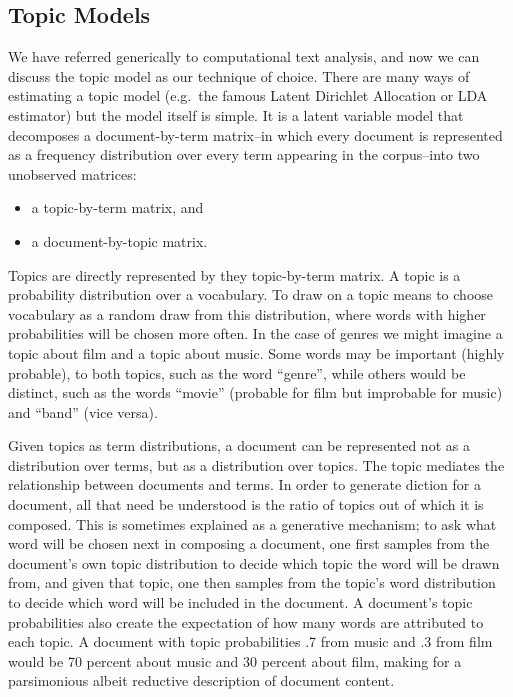 \documentclass[]{book}
\providecommand{\tightlist}{%
  \setlength{\itemsep}{0pt}\setlength{\parskip}{0pt}}
\theoremstyle{definition}
\theoremstyle{definition}
\theoremstyle{definition}
\theoremstyle{remark}
\begin{document}
\hypertarget{topic-models}{%
\subsection{Topic Models}\label{topic-models}}

We have referred generically to computational text analysis, and now we
can discuss the topic model as our technique of choice. There are many
ways of estimating a topic model (e.g.~the famous Latent Dirichlet
Allocation or LDA estimator) but the model itself is simple. It is a
latent variable model that decomposes a document-by-term matrix--in
which every document is represented as a frequency distribution over
every term appearing in the corpus--into two unobserved matrices:

\begin{itemize}
\tightlist
\item
  a topic-by-term matrix, and
\item
  a document-by-topic matrix.
\end{itemize}

Topics are directly represented by they topic-by-term matrix. A topic is
a probability distribution over a vocabulary. To draw on a topic means
to choose vocabulary as a random draw from this distribution, where
words with higher probabilities will be chosen more often. In the case
of genres we might imagine a topic about film and a topic about music.
Some words may be important (highly probable), to both topics, such as
the word ``genre'', while others would be distinct, such as the words
``movie'' (probable for film but improbable for music) and ``band''
(vice versa).

Given topics as term distributions, a document can be represented not as
a distribution over terms, but as a distribution over topics. The topic
mediates the relationship between documents and terms. In order to
generate diction for a document, all that need be understood is the
ratio of topics out of which it is composed. This is sometimes explained
as a generative mechanism; to ask what word will be chosen next in
composing a document, one first samples from the document's own topic
distribution to decide which topic the word will be drawn from, and
given that topic, one then samples from the topic's word distribution to
decide which word will be included in the document. A document's topic
probabilities also create the expectation of how many words are
attributed to each topic. A document with topic probabilities .7 from
music and .3 from film would be 70 percent about music and 30 percent
about film, making for a parsimonious albeit reductive description of
document content.
\end{document}
